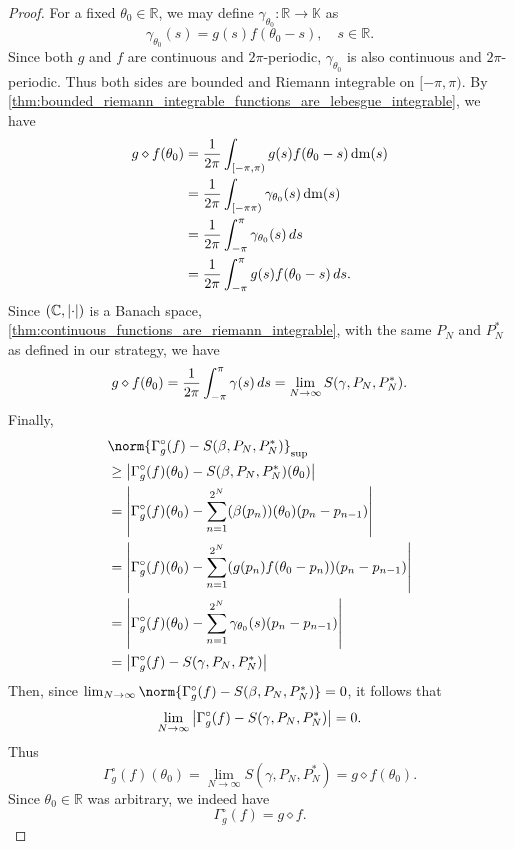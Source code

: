 \documentclass[notoc,notitlepage]{tufte-book}
\DeclareMathOperator{\dm}{dm}
\begin{document}
\begin{proof}
  For a fixed $\theta_0 \in \mathbb{R}$, we may define
  $\gamma_{\theta_0} : \mathbb{R} \to \mathbb{K}$ as
  \begin{equation*}
    \gamma_{\theta_0}(s) = g(s)f(\theta_0 - s), \quad s \in \mathbb{R}.
  \end{equation*}
  Since both $g$ and $f$ are continuous and $2\pi$-periodic,
  $\gamma_{\theta_0}$ is also continuous and $2\pi$-periodic.
  Thus both sides are bounded and Riemann integrable on $[-\pi, \pi)$.
  By \cref{thm:bounded_riemann_integrable_functions_are_lebesgue_integrable},
  we have
   \begin{align*}
    g \diamond f(\theta_0)
    &= \frac{1}{2\pi} \int_{[-\pi, \pi)} g(s)f(\theta_0 - s) \dm(s) \\
    &= \frac{1}{2\pi} \int_{[-\pi \pi)} \gamma_{\theta_0}(s) \dm(s) \\
    &= \frac{1}{2\pi} \int_{-\pi}^{\pi} \gamma_{\theta_0}(s) \dif{s} \\
    &= \frac{1}{2\pi} \int_{-\pi}^{\pi} g(s)f(\theta_0 - s) \dif{s}.
  \end{align*}
  Since $(\mathbb{C}, \left|\cdot\right|)$ is a Banach space,
  \cref{thm:continuous_functions_are_riemann_integrable}, with the same $P_N$
  and $P_N^*$ as defined in our strategy, we have
  \begin{equation*}
    g \diamond f(\theta_0) = \frac{1}{2\pi} \int_{-\pi}^{\pi} \gamma(s) \mathop{}\!d{s}
    = \lim_{N \to \infty} S(\gamma, P_N, P_N^*).
  \end{equation*}
  Finally,
  \begin{align*}
    &\norm{\Gamma_g^{\circ}(f) - S(\beta, P_N, P_N^*)}_{\sup} \\
    &\geq \abs{\Gamma_g^{\circ}(f)(\theta_0) - S(\beta, P_N, P_N^*)(\theta_0)} \\
    &= \abs{\Gamma_g^\circ(f)(\theta_0) - 
      \sum_{n=1}^{2^N} (\beta(p_n))(\theta_0)(p_n - p_{n-1})} \\
    &= \abs{\Gamma_g^\circ(f)(\theta_0) - 
      \sum_{n=1}^{2^N} (g(p_n)f(\theta_0 - p_n))(p_n - p_{n-1})} \\
    &= \abs{\Gamma_g^\circ(f)(\theta_0) - 
      \sum_{n=1}^{2^N} \gamma_{\theta_0}(s)(p_n - p_{n-1})} \\
    &= \abs{\Gamma_g^{\circ}(f) - S(\gamma, P_N, P_N^*)}
  \end{align*}
  Then, since
  $\lim_{N \to \infty} \norm{\Gamma_g^\circ(f) - S(\beta, P_N, P_N^*)} = 0$,
  it follows that
  \begin{equation*}
    \lim_{N \to \infty} \left|\Gamma_g^{\circ}(f) - S(\gamma, P_N, P_N^*)\right| = 0.
  \end{equation*}
  Thus
  \begin{equation*}
    \Gamma_g^\circ(f)(\theta_0) = \lim_{N \to \infty} S(\gamma, P_N, P_N^*)
    = g \diamond f(\theta_0).
  \end{equation*}
  Since $\theta_0 \in \mathbb{R}$ was arbitrary, we indeed have
  \begin{equation*}
    \Gamma_g^\circ(f) = g \diamond f.
  \end{equation*}
\end{proof}
\end{document}
